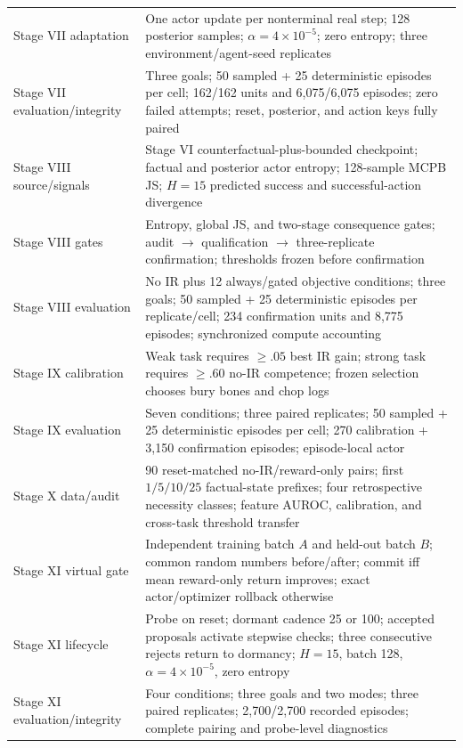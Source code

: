 \documentclass[10pt]{article}
\begin{document}
{\begin{longtable}{>{\raggedright\arraybackslash}p{.24\linewidth}p{.68\linewidth}}
Stage VII adaptation & One actor update per nonterminal real step; 128 posterior samples; $\alpha=4\times10^{-5}$; zero entropy; three environment/agent-seed replicates \\
Stage VII evaluation/integrity & Three goals; 50 sampled + 25 deterministic episodes per cell; 162/162 units and 6,075/6,075 episodes; zero failed attempts; reset, posterior, and action keys fully paired \\
Stage VIII source/signals & Stage VI counterfactual-plus-bounded checkpoint; factual and posterior actor entropy; 128-sample MCPB JS; $H=15$ predicted success and successful-action divergence \\
Stage VIII gates & Entropy, global JS, and two-stage consequence gates; audit $\rightarrow$ qualification $\rightarrow$ three-replicate confirmation; thresholds frozen before confirmation \\
Stage VIII evaluation & No IR plus 12 always/gated objective conditions; three goals; 50 sampled + 25 deterministic episodes per replicate/cell; 234 confirmation units and 8,775 episodes; synchronized compute accounting \\
Stage IX calibration & Weak task requires $\geq .05$ best IR gain; strong task requires $\geq .60$ no-IR competence; frozen selection chooses bury bones and chop logs \\
Stage IX evaluation & Seven conditions; three paired replicates; 50 sampled + 25 deterministic episodes per cell; 270 calibration + 3,150 confirmation episodes; episode-local actor \\
Stage X data/audit & 90 reset-matched no-IR/reward-only pairs; first $1/5/10/25$ factual-state prefixes; four retrospective necessity classes; feature AUROC, calibration, and cross-task threshold transfer \\
Stage XI virtual gate & Independent training batch $A$ and held-out batch $B$; common random numbers before/after; commit iff mean reward-only return improves; exact actor/optimizer rollback otherwise \\
Stage XI lifecycle & Probe on reset; dormant cadence 25 or 100; accepted proposals activate stepwise checks; three consecutive rejects return to dormancy; $H=15$, batch 128, $\alpha=4\times10^{-5}$, zero entropy \\
Stage XI evaluation/integrity & Four conditions; three goals and two modes; three paired replicates; 2,700/2,700 recorded episodes; complete pairing and probe-level diagnostics \\
\end{longtable}
}
\end{document}
